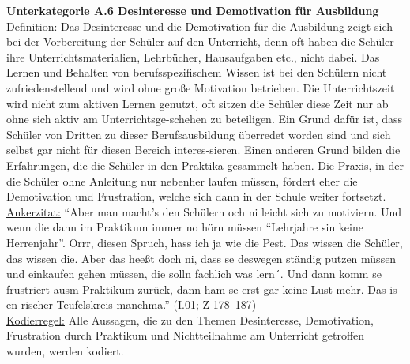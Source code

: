 \textbf{Unterkategorie A.6 Desinteresse und Demotivation für Ausbildung}\\
\underline{Definition:} Das Desinteresse und die Demotivation für die Ausbildung zeigt sich bei der Vorbereitung der Schüler auf den Unterricht, denn oft haben die Schüler ihre Unterrichtsmaterialien, Lehrbücher, Hausaufgaben etc., nicht dabei. Das Lernen und Behalten von berufsspezifischem Wissen ist bei den Schülern nicht zufriedenstellend und wird ohne große Motivation betrieben. Die Unterrichtszeit wird nicht zum aktiven Lernen genutzt, oft sitzen die Schüler diese Zeit nur ab ohne sich aktiv am Unterrichtsge-schehen zu beteiligen. Ein Grund dafür ist, dass Schüler von Dritten zu dieser Berufsausbildung überredet worden sind und sich selbst gar nicht für diesen Bereich interes-sieren. Einen anderen Grund bilden die Erfahrungen, die die Schüler in den Praktika gesammelt haben. Die Praxis, in der die Schüler ohne Anleitung nur nebenher laufen müssen, fördert eher die Demotivation und Frustration, welche sich dann in der Schule weiter fortsetzt. \\
\underline{Ankerzitat:} "`Aber man macht’s den Schülern och ni leicht sich zu motiviern. Und wenn die dann im Praktikum immer no hörn müssen "`Lehrjahre sin keine Herrenjahr"'. Orrr, diesen Spruch, hass ich ja wie die Pest. Das wissen die Schüler, das wissen die. Aber das heeßt doch ni, dass se deswegen ständig putzen müssen und einkaufen gehen müssen, die solln fachlich was lern´. Und dann komm se frustriert ausm Praktikum zurück, dann ham se erst gar keine Lust mehr. Das is en rischer Teufelskreis manchma."' (I.01; Z 178--187)\\
\underline{Kodierregel:} Alle Aussagen, die zu den Themen Desinteresse, Demotivation, Frustration durch Praktikum und Nichtteilnahme am Unterricht getroffen wurden, werden kodiert.\\

